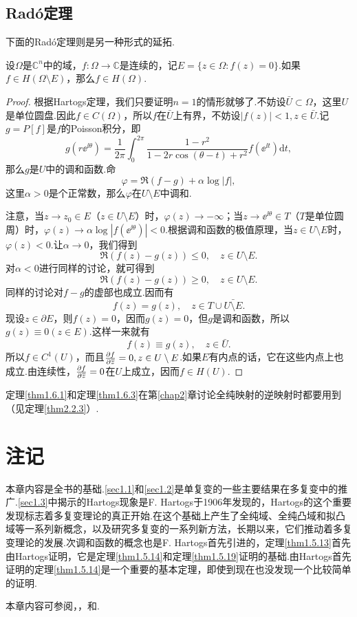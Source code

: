 \subsection{Rad\'o定理}
下面的Rad\'o定理则是另一种形式的延拓.
\begin{theorem}\label{thm1.6.3}
	设$\Omega$是$\mathbb{C}^n$中的域，$f\colon\Omega\to\mathbb{C}$是连续的，记$E=\{z\in\Omega\colon f(z)=0\}$.如果$f\in H(\Omega\setminus E)$，那么$f\in H(\Omega)$.
\end{theorem}
\begin{proof}
	根据Hartogs定理，我们只要证明$n=1$的情形就够了.不妨设$\bar{U}\subset\Omega$，这里$U$是单位圆盘.因此$f\in C(\Omega)$，所以$f$在$\bar{U}$上有界，不妨设$|f(z)|<1,z\in\bar{U}$.记$g=P[f]$是$f$的Poisson积分，即
	\[g(r\ee^{\ii\theta})=\frac1{2\pi}\int_{0}^{2\pi}\frac{1-r^2}{1-2r\cos(\theta-t)+r^2}f(\ee^{\ii t})\mathrm{d}t,\]
	那么$g$是$U$中的调和函数.命
	\[\varphi=\Re(f-g)+\alpha\log|f|,\]
	这里$\alpha>0$是个正常数，那么$\varphi$在$U\setminus E$中调和.
	
	注意，当$z\to z_0\in E$（$z\in U\setminus E$）时，$\varphi(z)\to-\infty$；当$z\to\ee^{\ii\theta}\in T$（$T$是单位圆周）时，$\varphi(z)\to\alpha\log|f(\ee^{\ii\theta})|<0$.根据调和函数的极值原理，当$z\in U\setminus E$时，$\varphi(z)<0$.让$\alpha\to0$，我们得到
	\[\Re(f(z)-g(z))\le0,\quad z\in U\setminus E.\]
	对$\alpha<0$进行同样的讨论，就可得到
	\[\Re(f(z)-g(z))\ge0,\quad z\in U\setminus E.\]
	同样的讨论对$f-g$的虚部也成立.因而有
	\[f(z)=g(z),\quad z\in T\cup\bar{U\setminus E}.\]
	现设$z\in\partial E$，则$f(z)=0$，因而$g(z)=0$，但$g$是调和函数，所以$g(z)\equiv0(z\in E)$.这样一来就有
	\[f(z)\equiv g(z),\quad z\in\bar{U}.\]
	所以$f\in C^1(U)$，而且$\frac{\partial f}{\partial {}\mkern1mu\overline{\mkern-1muz}}=0,z\in U\setminus E$.如果$E$有内点的话，它在这些内点上也成立.由连续性，$\frac{\partial f}{\partial {}\mkern1mu\overline{\mkern-1muz}}=0$在$U$上成立，因而$f\in H(U)$.
\end{proof}
定理\ref{thm1.6.1}和定理\ref{thm1.6.3}在第\ref{chap2}章讨论全纯映射的逆映射时都要用到（见定理\ref{thm2.2.3}）.
\section*{注记}
本章内容是全书的基础.\ref{sec1.1}和\ref{sec1.2}是单复变的一些主要结果在多复变中的推广.\ref{sec1.3}中揭示的Hartogs现象是F. Hartogs于1906年发现的，Hartogs的这个重要发现标志着多复变理论的真正开始.在这个基础上产生了全纯域、全纯凸域和拟凸域等一系列新概念，以及研究多复变的一系列新方法，长期以来，它们推动着多复变理论的发展.次调和函数的概念也是F. Hartogs首先引进的，定理\ref{thm1.5.13}首先由Hartogs证明，它是定理\ref{thm1.5.14}和定理\ref{thm1.5.19}证明的基础.由Hartogs首先证明的定理\ref{thm1.5.14}是一个重要的基本定理，即使到现在也没发现一个比较简单的证明.

本章内容可参阅\cite{narasimhan1971several}，\cite{hormander1973introduction}，\cite{krantz2001function}和\cite{rudin2008function}.